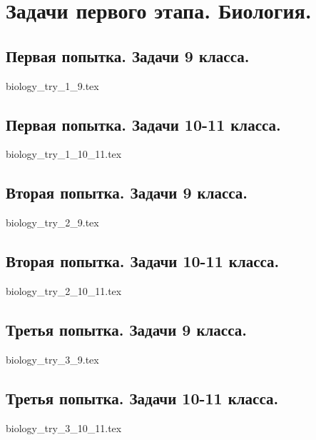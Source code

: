 \chapter{Задачи первого этапа. Биология.}

\section{Первая попытка. Задачи 9 класса.}

{biology_try_1_9.tex}

\section{Первая попытка. Задачи 10-11 класса.}

{biology_try_1_10_11.tex}

\section{Вторая попытка. Задачи 9 класса.}

{biology_try_2_9.tex}

\section{Вторая попытка. Задачи 10-11 класса.}

{biology_try_2_10_11.tex}

\section{Третья попытка. Задачи 9 класса.}

{biology_try_3_9.tex}

\section{Третья попытка. Задачи 10-11 класса.}

{biology_try_3_10_11.tex}
